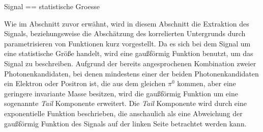 Signal == statistische Groesse


Wie im Abschnitt zuvor erw\"ahnt, wird in diesem Abschnitt die Extraktion des Signals, beziehungsweise die Absch\"atzung des korrelierten Untergrunds durch parametrisieren von Funktionen kurz vorgestellt.
\newline
Da es sich bei dem Signal um eine statistische Gr\"o{\ss}e handelt, wird eine gau{\ss}f\"ormig Funktion benutzt, um das Signal zu beschreiben.
Aufgrund der bereits angesprochenen Kombination zweier Photonenkandidaten, bei denen mindestens einer der beiden Photonenkandidaten ein Elektron oder Positron ist, die aus dem gleichen $\pi^{0}$ kommen, aber eine geringere invariante Masse besitzen, wird die gau{\ss}f\"ormig Funktion um eine sogenannte \textit{Tail} Komponente erweitert.
Die \textit{Tail} Komponente wird durch eine exponentielle Funktion beschrieben, die anschaulich als eine Abweichung der gau{\ss}f\"ormig Funktion des Signals auf der linken Seite betrachtet werden kann.
